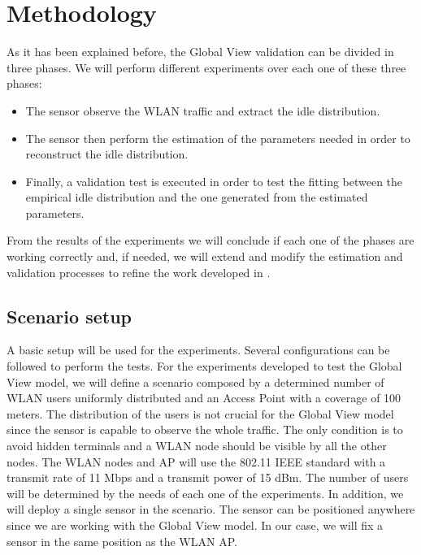 \section{Methodology} \label{sec:globalview_methodology}
As it has been explained before, the Global View validation can be divided in three phases. We will perform different experiments over each one of these three phases:

\begin{itemize}
	\item The sensor observe the \acs{WLAN} traffic and extract the idle distribution.
	\item The sensor then perform the estimation of the parameters needed in order to reconstruct the idle distribution.
	\item Finally, a validation test is executed in order to test the fitting between the empirical idle distribution and the one generated from the estimated parameters.
\end{itemize}

From the results of the experiments we will conclude if each one of the phases are working correctly and, if needed, we will extend and modify the estimation and validation processes to refine the work developed in \cite{marcello}.

\subsection{Scenario setup} \label{sec:sensor}
A basic setup will be used for the experiments. Several configurations can be followed to perform the tests. For the experiments developed to test the Global View model, we will define a scenario composed by a determined number of \acs{WLAN} users uniformly distributed and an Access Point with a coverage of 100 meters. The distribution of the users is not crucial for the Global View model since the sensor is capable to observe the whole traffic. The only condition is to avoid hidden terminals and a \acs{WLAN} node should be visible by all the other nodes. The \acs{WLAN} nodes and \acs{AP} will use the 802.11 \acs{IEEE} standard with a transmit rate of 11 Mbps and a transmit power of 15 dBm. The number of users will be determined by the needs of each one of the experiments. In addition, we will deploy a single sensor in the scenario. The sensor can be positioned anywhere since we are working with the Global View model. In our case, we will fix a sensor in the same position as the \acs{WLAN} \acs{AP}. 

